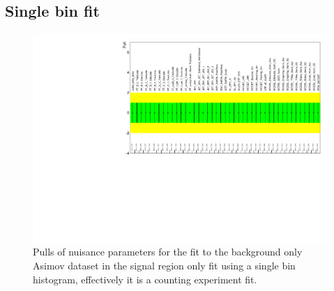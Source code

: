 

% 
\subsection{Single bin fit}
\label{app:boosted_fitstudies_SR_singlebin}

\begin{figure}[!h]
\begin{center}
\includegraphics*[width=1.00\textwidth]{./figures/boosted/SROnlyFitOneBin/NP_allExceptGammas}
\caption{Pulls of nuisance parameters for the fit to the background only Asimov dataset in the signal region only fit using a single bin histogram,
effectively it is a counting experiment fit.}
\label{fig:boosted_fitstudies_SRsinglebin_pullplot}
\end{center}
\end{figure}

